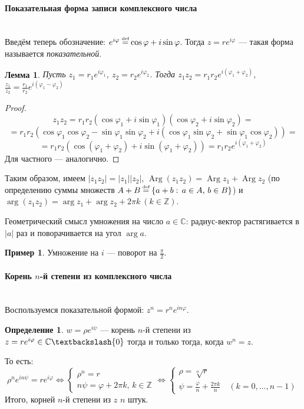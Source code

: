 \documentclass[11pt,openany,a4paper]{scrartcl}
\theoremstyle{plain}
\newtheorem{lemma}[theorem]{Лемма}
\theoremstyle{definition}
\newtheorem{definition}[theorem]{Определение}
\newtheorem{example}[theorem]{Пример}
\newcommand\mb{\mathbb}
\newcommand{\complex}{\mb C}
\newcommand\eqdef{\mathrel{\stackrel{\makebox[0pt]{\mbox{\normalfont\tiny def}}}{=}}}
\newcommand\lparagraph[1]{\paragraph{#1}\mbox{}\\}
\DeclareMathOperator{\Arg}{Arg}
\begin{document}
\lparagraph{Показательная форма записи комплексного числа}

Введём теперь обозначение: $e^{i\varphi} \eqdef \cos \varphi + i\sin \varphi$. Тогда $z = re^{i\varphi}$ — такая
форма называется \emph{показательной}.

\begin{lemma}
	Пусть $z_1 = r_1 e^{i\varphi_1}$, $z_2 = r_2 e^{i\varphi_2}$. Тогда $z_1z_2 = r_1r_2e^{i(\varphi_1 +
	\varphi_2)}$, $\frac{z_1}{z_2} = \frac{r_1}{r_2}e^{i(\varphi_1 -
	\varphi_2)}$
\end{lemma}
\begin{proof}
	$$
	z_1z_2 = r_1r_2(\cos \varphi_1 + i\sin \varphi_1)(\cos \varphi_2 + i\sin \varphi_2) =
	$$
	$$
	= r_1r_2(\cos \varphi_1 \cos \varphi_2 - \sin \varphi_1 \sin \varphi_2 + i(\cos \varphi_1 \sin \varphi_2 + \sin \varphi_1 \cos \varphi_2)) =
	$$
	$$
	= r_1r_2(\cos (\varphi_1 + \varphi_2) + i\sin (\varphi_1 + \varphi_2)) = r_1r_2e^{i(\varphi_1 + \varphi_2)}
	$$
	Для частного — аналогично.
\end{proof}

Таким образом, имеем $|z_1z_2| = |z_1||z_2|$, $\Arg (z_1z_2) = \Arg z_1 + \Arg z_2$ (по определению суммы множеств 
$A + B \eqdef \{a + b:\, a \in A,\, b \in B\}$) и $\arg (z_1z_2) = \arg z_1 + \arg z_2 + 2\pi k\:(k\in
\mb Z)$.

Геометрический смысл умножения на число $a \in \complex$: радиус-вектор растягивается в $|a|$ раз и поворачивается на
угол $\arg a$.

\begin{example}
	Умножение на $i$ — поворот на $\frac{\pi}{2}$.
\end{example}

\lparagraph{Корень $n$-й степени из комплексного числа}

Воспользуемся показательной формой: $z^n = r^ne^{in\varphi}$.
\begin{definition}
	$w = \rho e^{i\psi}$ — корень $n$-й степени из $z = re^{i\varphi} \in \complex \textbackslash \{0\}$ тогда и только тогда, когда $w^n = z$.
\end{definition}

То есть:
$$
\rho^ne^{in\psi} = re^{i\varphi} \iff
\begin{cases}
	\rho^n = r\\
	n\psi = \varphi + 2\pi k,\,k \in \mb Z
\end{cases}
\iff
\begin{cases}
	\rho = \sqrt[n]{r}\\
	\psi = \frac{\varphi}{n} + \frac{2\pi k}{n}\quad(k = 0,...,n - 1)
\end{cases}
$$
Итого, корней $n$-й степени из $z$ $n$ штук.
\end{document}
